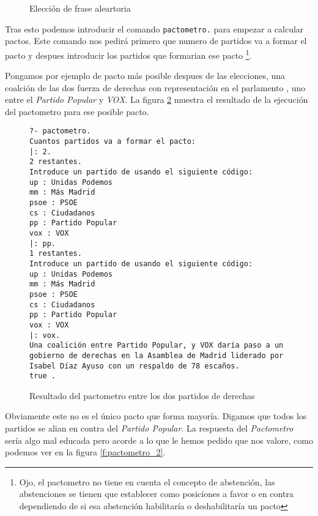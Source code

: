 \documentclass[a4paper, 12pt]{article}
\begin{document}
	\begin{figure}[ht!]
		\inputminted[firstline=29,lastline=55,breaklines]
		{prolog}{../src/comentarios.pl}
		\caption{Elección de frase aleartoria}
		\label{f:comentario_ganador}
	\end{figure}

	Tras esto podemos introducir el comando \texttt{pactometro.} para empezar a 
calcular pactos. Este comando nos pedirá primero que numero de partidos va a 
formar el pacto y despues introducir los partidos que formarian ese pacto
\footnote{Ojo, el pactometro no tiene en cuenta el concepto de abstención, las 
abstenciones se tienen que establecer como posiciones a favor o en contra
dependiendo de si esa abstención habilitaría o deshabilitaría un pacto}.
\\\mbox{}

	Pongamos por ejemplo de pacto más posible despues de las elecciones, una 
coalción de las dos fuerza de derechas con representación en el parlamento
, uno entre el \textit{Partido Popular} y \textit{VOX}. La figura 
\ref{f:pactometro_1} muestra el resultado de la ejecución del pactometro para
ese posible pacto.\\\mbox{}

\begin{figure}[ht!]
	\begin{verbatim}
?- pactometro.
Cuantos partidos va a formar el pacto: 
|: 2.
2 restantes.
Introduce un partido de usando el siguiente código: 
up : Unidas Podemos
mm : Más Madrid
psoe : PSOE
cs : Ciudadanos
pp : Partido Popular
vox : VOX
|: pp.
1 restantes.
Introduce un partido de usando el siguiente código: 
up : Unidas Podemos
mm : Más Madrid
psoe : PSOE
cs : Ciudadanos
pp : Partido Popular
vox : VOX
|: vox.
Una coalición entre Partido Popular, y VOX daría paso a un gobierno de derechas en la Asamblea de Madrid liderado por Isabel Díaz Ayuso con un respaldo de 78 escaños.
true .
	\end{verbatim}
	\caption{Resultado del pactometro entre los dos partidos de derechas}
	\label{f:pactometro_1}
\end{figure}

	Obviamente este no es el único pacto que forma mayoría. Digamos que todos
los partidos se alian en contra del \textit{Partido Popular}. La respuesta del 
\textit{Pactometro} sería algo mal educada pero acorde a lo que le hemos pedido 
que nos valore, como podemos ver en la figura \ref{f:pactometro_2}.\\\mbox{}
\end{document}
